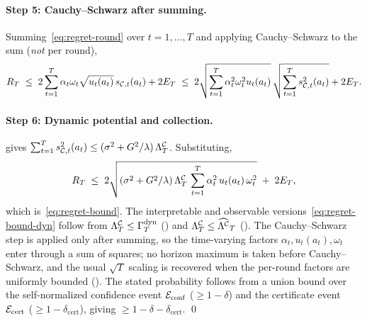 \paragraph{Step 5: Cauchy--Schwarz after summing.}
Summing~\eqref{eq:regret-round} over $t=1,\dots,T$ and applying
Cauchy--Schwarz to the sum (\emph{not} per round),
\[
  R_T
  \;\le\;
  2\sum_{t=1}^T \alpha_t\omega_t\sqrt{u_t(a_t)}\,s_{\mathcal{C},t}(a_t) + 2E_T
  \;\le\;
  2\sqrt{\sum_{t=1}^T \alpha_t^2\omega_t^2 u_t(a_t)}\,
  \sqrt{\sum_{t=1}^T s_{\mathcal{C},t}^2(a_t)} + 2E_T .
\]

\paragraph{Step 6: Dynamic potential and collection.}
 gives
$\sum_{t=1}^T s_{\mathcal{C},t}^2(a_t)\le(\sigma^2+G^2/\lambda)\,\Lambda^{\mathcal{C}}_T$.
Substituting,
\[
  R_T
  \;\le\;
  2\sqrt{(\sigma^2+G^2/\lambda)\,\Lambda^{\mathcal{C}}_T\,
    \sum_{t=1}^T \alpha_t^2\,u_t(a_t)\,\omega_t^2} \;+\; 2E_T,
\]
which is~\eqref{eq:regret-bound}.  The interpretable and observable
versions~\eqref{eq:regret-bound-dyn} follow from $\Lambda^{\mathcal{C}}_T\le\Gamma^{\mathrm{dyn}}_T$
() and $\Lambda^{\mathcal{C}}_T\le\widehat{\Lambda^{\mathcal{C}}}_T$
().  The Cauchy--Schwarz step is applied only after
summing, so the time-varying factors $\alpha_t,u_t(a_t),\omega_t$ enter
through a sum of squares; no horizon maximum is taken before Cauchy--Schwarz, and
the usual $\sqrt{T}$ scaling is recovered when the per-round factors are
uniformly bounded ().  The stated probability follows from a
union bound over the self-normalized confidence event
$\mathcal{E}_{\mathrm{conf}}$ ($\ge 1-\delta$) and the certificate event
$\mathcal{E}_{\mathrm{cert}}$ ($\ge 1-\delta_{\mathrm{cert}}$), giving
$\ge 1-\delta-\delta_{\mathrm{cert}}$.
\qed
